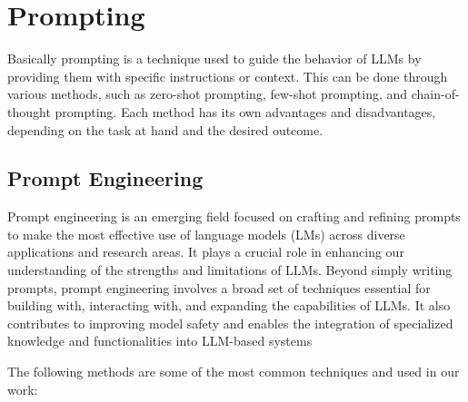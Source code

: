 



\section{Prompting}

Basically prompting is a technique used to guide the behavior of LLMs by providing them with specific instructions or context. 
This can be done through various methods, such as zero-shot prompting, few-shot prompting, and chain-of-thought prompting. 
Each method has its own advantages and disadvantages, depending on the task at hand and the desired outcome.


\subsection{Prompt Engineering}

Prompt engineering is an emerging field focused on crafting and refining prompts to make the most effective use of language models (LMs) 
across diverse applications and research areas. It plays a crucial role in enhancing our understanding of the strengths and limitations of LLMs. 
Beyond simply writing prompts, prompt engineering involves a broad set of techniques essential for building with, interacting with, and expanding the capabilities of LLMs. 
It also contributes to improving model safety and enables the integration of specialized knowledge and functionalities into LLM-based systems

The following methods are some of the most common techniques and used in our work:

